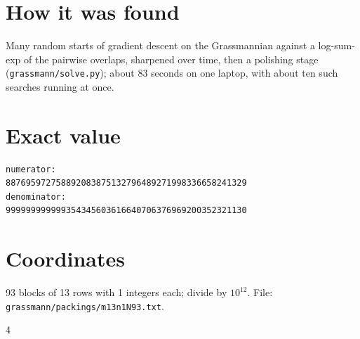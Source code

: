 \documentclass[11pt,a4paper]{article}
\begin{document}
\section{How it was found}
Many random starts of gradient descent on the Grassmannian against a log-sum-exp of the pairwise overlaps, sharpened over time, then a polishing stage (\texttt{grassmann/solve.py}); about 83 seconds on one laptop, with about ten such searches running at once.


\appendix
\section{Exact value}
{\small
\begin{verbatim}
numerator:
887695972758892083875132796489271998336658241329
denominator:
999999999999354345603616640706376969200352321130
\end{verbatim}}

\section{Coordinates}
93 blocks of 13 rows with 1 integers each; divide by $10^{12}$. File: \texttt{grassmann/packings/m13n1N93.txt}.
{\tiny
\begin{multicols}{4}
\end{multicols}}
\end{document}
